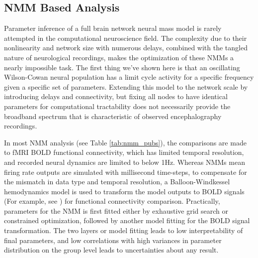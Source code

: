 \subsection{NMM Based Analysis}
Parameter inference of a full brain network neural mass model is rarely attempted in the computational neuroscience field. The complexity due to their nonlinearity and network size with numerous delays, combined with the tangled nature of neurological recordings, makes the optimization of these NMMs a nearly impossible task. The first thing we've shown here is that an oscillating Wilson-Cowan neural population has a limit cycle activity for a specific frequency given a specific set of parameters. Extending this model to the network scale by introducing delays and connectivity, but fixing all nodes to have identical parameters for computational tractability does not necessarily provide the broadband spectrum that is characteristic of observed encephalography recordings.

In most NMM analysis (see Table \ref{tab:nmm_pubs}), the comparisons are made to fMRI BOLD functional connectivity, which has limited temporal resolution, and recorded neural dynamics are limited to below 1Hz. Whereas NMMs mean firing rate outputs are simulated with millisecond time-steps, to compensate for the mismatch in data type and temporal resolution, a Balloon-Windkessel hemodynamics model \cite{friston_nonlinear_2000, deco_resting-state_2013} is used to transform the model outputs to BOLD signals (For example, see \cite{deco_resting-state_2013, deco_how_2014}) for functional connectivity comparison. Practically, parameters for the NMM is first fitted either by exhaustive grid search or constrained optimization, followed by another model fitting for the BOLD signal transformation. The two layers or model fitting leads to low interpretability of final parameters, and low correlations with high variances in parameter distribution on the group level leads to uncertainties about any result. 

